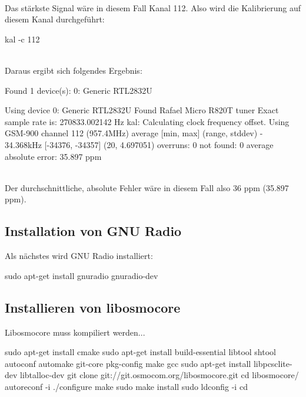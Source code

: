 \noindent\\Das stärkste Signal wäre in diesem Fall Kanal 112. Also wird die Kalibrierung auf diesem Kanal durchgeführt:

\begin{code}
kal -c 112 
\end{code}

\noindent\\Daraus ergibt sich folgendes Ergebnis:

\begin{code}
Found 1 device(s):
  0:  Generic RTL2832U

Using device 0: Generic RTL2832U
Found Rafael Micro R820T tuner
Exact sample rate is: 270833.002142 Hz
kal: Calculating clock frequency offset.
Using GSM-900 channel 112 (957.4MHz)
average		[min, max]	(range, stddev)
- 34.368kHz		[-34376, -34357]	(20, 4.697051)
overruns: 0
not found: 0
average absolute error: 35.897 ppm
\end{code}

\noindent\\Der durchschnittliche, absolute Fehler wäre in diesem Fall also 36 ppm (35.897 ppm).

%
%

\subsection{Installation von GNU Radio}

Als nächstes wird GNU Radio installiert:

\begin{code}
sudo apt-get install gnuradio gnuradio-dev
\end{code}

\subsection{Installieren von libosmocore}

Libosmocore muss kompiliert werden...

\begin{code}[numbers=left, stepnumber=1]
sudo apt-get install cmake
sudo apt-get install build-essential libtool shtool autoconf automake git-core pkg-config make gcc
sudo apt-get install libpcsclite-dev libtalloc-dev
git clone git://git.osmocom.org/libosmocore.git
cd libosmocore/
autoreconf -i
./configure
make
sudo make install
sudo ldconfig -i
cd
\end{code}

